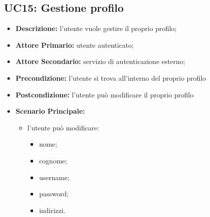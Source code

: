 \subsection{UC15: Gestione profilo}
\label{sec:UC15}
\begin{itemize}
    \item \textbf{Descrizione:} l'utente vuole gestire il proprio profilo;
    \item \textbf{Attore Primario:} utente autenticato;
    \item \textbf{Attore Secondario:} servizio di autenticazione esterno;
    \item \textbf{Precondizione:} l'utente si trova all'interno del proprio profilo
    \item \textbf{Postcondizione:} l'utente può modificare il proprio profilo
    \item \textbf{Scenario Principale:}
          \begin{itemize}
              \item  l'utente può modificare:
                    \begin{itemize}
                        \item nome;
                        \item cognome;
                        \item username;
                        \item password;
                        \item indirizzi.
                    \end{itemize}
          \end{itemize}
\end{itemize}